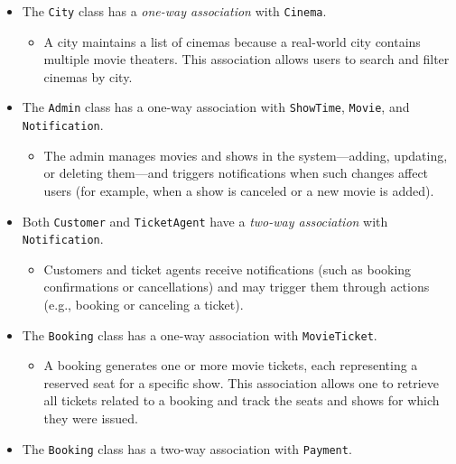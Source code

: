 \begin{itemize}
\item
\protect{}\label{8qCDdtaHp0IBHY2U5WaXt}
The \texttt{City} class has a \emph{one-way association} with \texttt{Cinema}.

\begin{itemize}
\item
A city maintains a list of cinemas because a real-world city contains multiple movie theaters. This association allows users to search and filter cinemas by city.
\end{itemize}
\item
\protect{}\label{GnmTuao1FX6uYz3RV2nE_}
The \texttt{Admin} class has a one-way association with \texttt{ShowTime}, \texttt{Movie}, and \texttt{Notification}.

\begin{itemize}
\item
The admin manages movies and shows in the system---adding, updating, or deleting them---and triggers notifications when such changes affect users (for example, when a show is canceled or a new movie is added).
\end{itemize}
\item
\protect{}\label{NyvvwjOrkxb5fSxFDO30p}
Both \texttt{Customer} and \texttt{TicketAgent} have a \emph{two-way association} with \texttt{Notification}.

\begin{itemize}
\item
Customers and ticket agents receive notifications (such as booking confirmations or cancellations) and may trigger them through actions (e.g., booking or canceling a ticket).
\end{itemize}
\item
\protect{}\label{0m4jo97188u40HDa6Eg4Z}
The \texttt{Booking} class has a one-way association with \texttt{MovieTicket}.

\begin{itemize}
\item
A booking generates one or more movie tickets, each representing a reserved seat for a specific show. This association allows one to retrieve all tickets related to a booking and track the seats and shows for which they were issued.
\end{itemize}
\item
\protect{}\label{A3Ttc3vhmPH01-BNCkEqV}
The \texttt{Booking} class has a two-way association with \texttt{Payment}.


\end{itemize}
